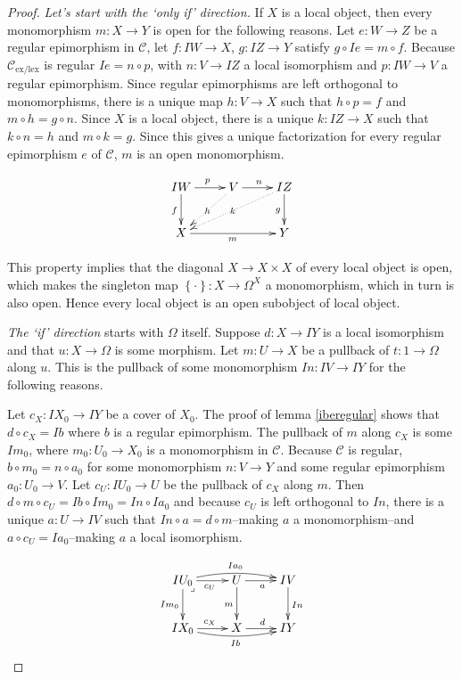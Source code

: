 \documentclass[sort&compress]{elsarticle}
\theoremstyle{plain}
\theoremstyle{definition}
\theoremstyle{remark}
\newcommand\cat\mathcal
\newcommand\set[1]{\left\{#1\right\}}
\newcommand\exlex{_\mathrm{ex/lex}}\newcommand\exreg{_\mathrm{ex/reg}}
\begin{document}
\begin{proof} \emph{Let's start with the `only if' direction.} If $X$ is a local object, then every monomorphism $m:X\to Y$ is open for the following reasons. Let $e:W\to Z$ be a regular epimorphism in $\cat C$, let $f:IW\to X$, $g:IZ\to Y$ satisfy $g\circ Ie = m\circ f$. Because $\cat C\exlex$ is regular $Ie = n\circ p$, with $n:V\to IZ$ a local isomorphism and $p:IW\to V$ a regular epimorphism. 
Since regular epimorphisms are left orthogonal to monomorphisms, there is a unique map $h:V\to X$ such that $h\circ p = f$ and $m\circ h = g\circ n$. Since $X$ is a local object, there is a unique $k:IZ\to X$ such that $k\circ n = h$ and $m\circ k = g$. Since this gives a unique factorization for every regular epimorphism $e$ of $\cat C$, $m$ is an open monomorphism.

\[ \xymatrix{
IW \ar[r]^p \ar[d]_{f}  & V \ar[r]^n\ar@{.>}[dl]|h & IZ \ar[d]_g\ar@{.>}[dll]|k \\
X \ar[rr]_m && Y
}\]

This property implies that the diagonal $X\to X\times X$ of every local object is open, which makes the singleton map $\set\cdot:X\to \Omega^X$ a monomorphism, which in turn is also open. Hence every local object is an open subobject of local object.


\emph{The `if' direction} starts with $\Omega$ itself. Suppose $d:X\to IY$ is a local isomorphism and that $u:X\to \Omega$ is some morphism. Let $m: U\to X$ be a pullback of $t:1\to \Omega$ along $u$. This is the pullback of some monomorphism $In:IV \to IY$ for the following reasons.

Let $c_X:IX_0 \to IY$ be a cover of $X_0$. The proof of lemma \ref{iberegular} shows that $d\circ c_X = Ib$ where $b$ is a regular epimorphism.
The pullback of $m$ along $c_X$ is some $Im_0$, where $m_0:U_0 \to X_0$ is a monomorphism in $\cat C$. Because $\cat C$ is regular, $b\circ m_0 = n\circ a_0$ for some monomorphism $n:V\to Y$ and some regular epimorphism $a_0:U_0\to V$. Let $c_U: IU_0\to U$ be the pullback of $c_X$ along $m$. Then $d\circ m\circ c_U = Ib\circ Im_0 = In\circ Ia_0$ and because $c_U$ is left orthogonal to $In$, there is a unique $a:U\to IV$ such that $In \circ a = d\circ m$--making $a$ a monomorphism--and $a\circ c_U = Ia_0$--making $a$ a local isomorphism.

\[\xymatrix{
IU_0 \ar[d]_{Im_0} \ar[r]_{c_U} \ar@/^/[rr]^{Ia_0}\ar@{}[dr]|<\lrcorner & U \ar[r]_a \ar[d]_{m} & IV \ar[d]^{In}\\
IX_0 \ar[r]^{c_X} \ar@/_/[rr]_{Ib} & X \ar[r]^d & IY
}\]


\end{proof}
\end{document}
